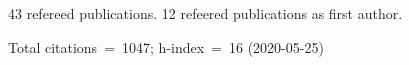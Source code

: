 43 refereed publications. 12 refeered publications as first author.

Total citations~=~1047; h-index~=~16 (2020-05-25)